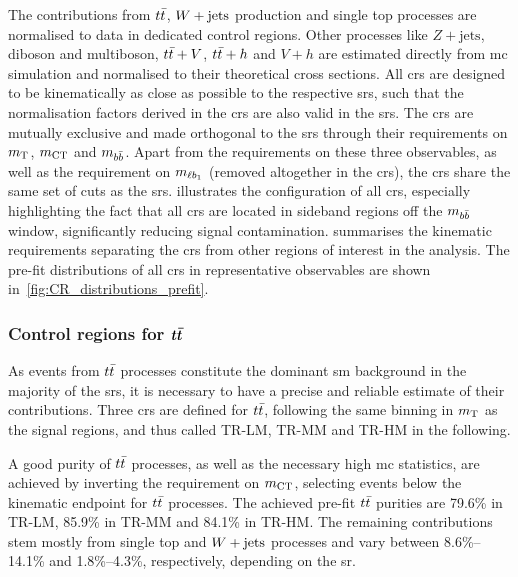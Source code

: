 The contributions from $\ttbar$, $W+\mathrm{jets}$ production and single top processes are normalised to data in dedicated control regions.
Other processes like $Z+\mathrm{jets}$, diboson and multiboson, $t\bar{t}+V$, $t\bar{t}+h$ and $V+h$ are estimated directly from \gls{mc} simulation and normalised to their theoretical cross sections.
All \glspl{cr} are designed to be kinematically as close as possible to the respective \glspl{sr}, such that the normalisation factors derived in the \glspl{cr} are also valid in the \glspl{sr}.
The \glspl{cr} are mutually exclusive and made orthogonal to the \glspl{sr} through their requirements on $m_{\textrm{T}}$, $m_{\textrm{CT}}$ and $m_{b\bar{b}}$.
Apart from the requirements on these three observables, as well as the requirement on $m_{\ell b_{1}}$ (removed altogether in the \glspl{cr}), the \glspl{cr} share the same set of cuts as the \glspl{sr}.
 illustrates the configuration of all \glspl{cr}, especially highlighting the fact that all \glspl{cr} are located in sideband regions off the $m_{b\bar{b}}$ window, significantly reducing signal contamination.
 summarises the kinematic requirements separating the \glspl{cr} from other regions of interest in the analysis. The pre-fit distributions of all \glspl{cr} in representative observables are shown in~\cref{fig:CR_distributions_prefit}.

\subsubsection[Control regions for $\ttbar$]{Control regions for $\boldsymbol{t\bar{t}}$}

As events from $\ttbar$ processes constitute the dominant \gls{sm} background in the majority of the \glspl{sr}, it is necessary to have a precise and reliable estimate of their contributions.
Three \glspl{cr} are defined for $\ttbar$, following the same binning in $m_{\textrm{T}}$ as the signal regions, and thus called TR-LM, TR-MM and TR-HM in the following.

A good purity of $\ttbar$ processes, as well as the necessary high \gls{mc} statistics, are achieved by inverting the requirement on $m_{\textrm{CT}}$, selecting events below the kinematic endpoint for $\ttbar$ processes.
The achieved pre-fit $\ttbar$ purities are 79.6\% in TR-LM, 85.9\% in TR-MM and 84.1\% in TR-HM.
The remaining contributions stem mostly from single top and $W+\mathrm{jets}$ processes and vary between 8.6\%--14.1\% and 1.8\%--4.3\%, respectively, depending on the \gls{sr}. 

